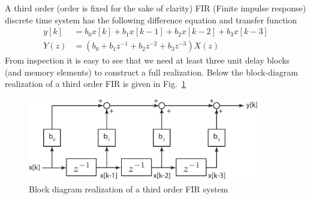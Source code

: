 \documentclass[twoside]{article}
\begin{document}
A third order (order is fixed for the sake of clarity) FIR (Finite
impulse response) discrete time system has the following
difference equation and transfer function
%
\begin{align*}
y[k] &= b_0 x[k] + b_1 x[k-1] + b_2 x[k-2] + b_3 x[k-3] \\ 
Y(z) &= \left( b_0 + b_1 z^{-1} + b_2 z^{-2} + b_3 z^{-3} \right) X(z)
\end{align*}
%
From inspection it is easy to see that we need at least three unit delay 
blocks (and memory elements) to construct a full realization. Below the
block-diagram realization of a third order FIR is given in Fig.~\ref{fig:FIR}
%
\begin{figure}[h]
    \centering
      \includegraphics[width=0.9\textwidth]{FIR}
    \caption{Block diagram realization of a third order FIR system}
        \label{fig:FIR}
\end{figure}

\newpage
\end{document}
